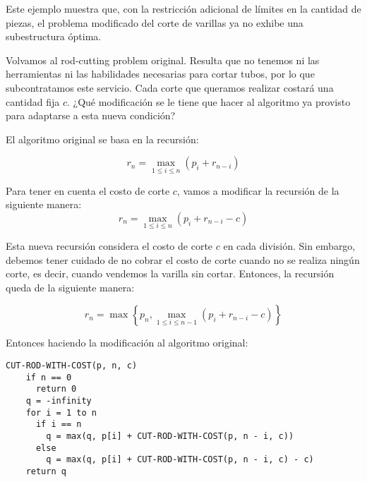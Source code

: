 \begin{problema}
\begin{sol}
        Este ejemplo muestra que, con la restricción adicional de límites en la cantidad de piezas, el problema modificado del corte de varillas ya no exhibe una subestructura óptima.
        
    \end{sol}

\end{problema}

\begin{problema}
    Volvamos al rod-cutting problem original. Resulta que no tenemos ni las herramientas ni las habilidades necesarias para cortar tubos, por lo que subcontratamos este servicio. Cada corte que queramos realizar costará una cantidad fija $c$. ¿Qué modificación se le tiene que hacer al algoritmo ya provisto para adaptarse a esta nueva condición?
    \begin{sol}
    El algoritmo original se basa en la recursión:

$$r_{n} = \max_{1 \le i \le n} (p_i + r_{n - i})$$

Para tener en cuenta el costo de corte $c$, vamos a modificar la recursión de la siguiente manera:
$$r_{n} = \max_{1 \le i \le n} (p_i + r_{n - i}-c)$$

Esta nueva recursión considera el costo de corte $c$ en cada división. Sin embargo, debemos tener cuidado de no cobrar el costo de corte cuando no se realiza ningún corte, es decir, cuando vendemos la varilla sin cortar. Entonces, la recursión queda de la siguiente manera:

$$r_{n}  = \max \left\{ p_n, \max_{1 \le i \le n-1} (p_i + r_{n - i} - c) \right\}$$

Entonces haciendo la modificación al algoritmo original: 
\begin{verbatim}
CUT-ROD-WITH-COST(p, n, c)
    if n == 0
      return 0
    q = -infinity
    for i = 1 to n
      if i == n
        q = max(q, p[i] + CUT-ROD-WITH-COST(p, n - i, c))
      else
        q = max(q, p[i] + CUT-ROD-WITH-COST(p, n - i, c) - c)
    return q
  
\end{verbatim}
    \end{sol}
\end{problema}

